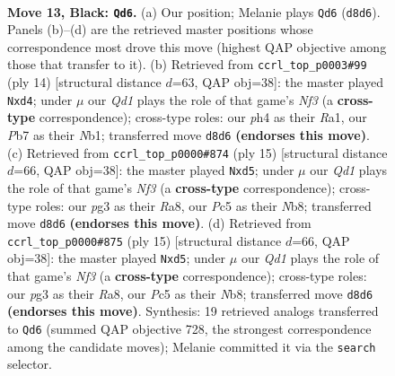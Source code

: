 \documentclass[11pt]{article}
\begin{document}
\clearpage

\begin{figure}[p]\centering
\begin{subfigure}{0.46\textwidth}\centering
\resizebox{\linewidth}{!}{%
\newchessgame
\chessboard[
  setfen={1rbq1rk1/ppn1npbp/6p1/2p1p3/7P/3PP1P1/PP3PBK/RNBQNR2 b - - 4 13},
  showmover=false,
  pgfstyle=straightmove, color=movearrow, markmove={d8-d6}
]}
\caption{}
\end{subfigure}\hfill
\begin{subfigure}{0.46\textwidth}\centering
\resizebox{\linewidth}{!}{%
\newchessgame
\chessboard[
  setfen={rnbqk2r/pp2ppbp/6p1/3n4/3p4/5NP1/PP2PPBP/RNBQ1RK1 w kq - 0 8},
  showmover=false,
  pgfstyle=straightmove, color=movearrow, markmove={f3-d4}
]}
\caption{}
\end{subfigure}
\\[4pt]
\begin{subfigure}{0.46\textwidth}\centering
\resizebox{\linewidth}{!}{%
\newchessgame
\chessboard[
  setfen={rnbq1rk1/pp2ppbp/5np1/3P4/3N4/6P1/PP2PPBP/RNBQ1RK1 b - - 0 8},
  showmover=false,
  pgfstyle=straightmove, color=movearrow, markmove={f6-d5}
]}
\caption{}
\end{subfigure}\hfill
\begin{subfigure}{0.46\textwidth}\centering
\resizebox{\linewidth}{!}{%
\newchessgame
\chessboard[
  setfen={rnbq1rk1/pp2ppbp/5np1/3P4/3N4/6P1/PP2PPBP/RNBQ1RK1 b - - 0 8},
  showmover=false,
  pgfstyle=straightmove, color=movearrow, markmove={f6-d5}
]}
\caption{}
\end{subfigure}
\caption{\textbf{Move 13, Black: \texttt{Qd6}.} (a) Our position; Melanie plays \texttt{Qd6} (\texttt{d8d6}). Panels (b)--(d) are the retrieved master positions whose correspondence most drove this move (highest QAP objective among those that transfer to it). (b) Retrieved from \texttt{ccrl\_top\_p0003\#99} (ply 14) [structural distance $d$=63, QAP obj=38]: the master played \texttt{Nxd4}; under $\mu$ our \emph{Qd1} plays the role of that game's \emph{Nf3} (a \textbf{cross-type} correspondence); cross-type roles: our \emph{p}h4 as their \emph{R}a1, our \emph{P}b7 as their \emph{N}b1; transferred move \texttt{d8d6} \textbf{(endorses this move)}. (c) Retrieved from \texttt{ccrl\_top\_p0000\#874} (ply 15) [structural distance $d$=66, QAP obj=38]: the master played \texttt{Nxd5}; under $\mu$ our \emph{Qd1} plays the role of that game's \emph{Nf3} (a \textbf{cross-type} correspondence); cross-type roles: our \emph{p}g3 as their \emph{R}a8, our \emph{P}c5 as their \emph{N}b8; transferred move \texttt{d8d6} \textbf{(endorses this move)}. (d) Retrieved from \texttt{ccrl\_top\_p0000\#875} (ply 15) [structural distance $d$=66, QAP obj=38]: the master played \texttt{Nxd5}; under $\mu$ our \emph{Qd1} plays the role of that game's \emph{Nf3} (a \textbf{cross-type} correspondence); cross-type roles: our \emph{p}g3 as their \emph{R}a8, our \emph{P}c5 as their \emph{N}b8; transferred move \texttt{d8d6} \textbf{(endorses this move)}. Synthesis: 19 retrieved analogs transferred to \texttt{Qd6} (summed QAP objective 728, the strongest correspondence among the candidate moves); Melanie committed it via the \texttt{search} selector.}
\label{fig:thought-m25}
\end{figure}
\end{document}
